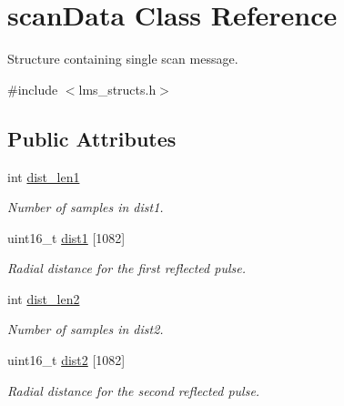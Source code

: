 \hypertarget{structscanData}{}\section{scan\+Data Class Reference}
\label{structscanData}


Structure containing single scan message.  




{\ttfamily \#include $<$lms\+\_\+structs.\+h$>$}

\subsection*{Public Attributes}
\begin{DoxyCompactItemize}
\item 
\mbox{\label{structscanData_a174799b2a6685ee3ef396480bfdb8038}} 
int \hyperlink{structscanData_a174799b2a6685ee3ef396480bfdb8038}{dist\+\_\+len1}
\begin{DoxyCompactList}\small\item\em Number of samples in dist1. \end{DoxyCompactList}\item 
\mbox{\label{structscanData_a2e9ff58a75be987db4c817a66655d87d}} 
uint16\+\_\+t \hyperlink{structscanData_a2e9ff58a75be987db4c817a66655d87d}{dist1} \mbox{[}1082\mbox{]}
\begin{DoxyCompactList}\small\item\em Radial distance for the first reflected pulse. \end{DoxyCompactList}\item 
\mbox{\label{structscanData_a0141762eb4e9938c3e3577f6c1c13aab}} 
int \hyperlink{structscanData_a0141762eb4e9938c3e3577f6c1c13aab}{dist\+\_\+len2}
\begin{DoxyCompactList}\small\item\em Number of samples in dist2. \end{DoxyCompactList}\item 
\mbox{\label{structscanData_a4eec5e8146438f5e0b896bb0384bf708}} 
uint16\+\_\+t \hyperlink{structscanData_a4eec5e8146438f5e0b896bb0384bf708}{dist2} \mbox{[}1082\mbox{]}
\begin{DoxyCompactList}\small\item\em Radial distance for the second reflected pulse. \end{DoxyCompactList}\item 

\end{DoxyCompactItemize}
